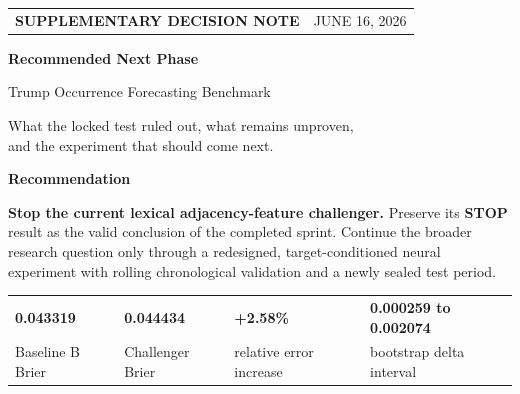\documentclass[10pt,a4paper]{article}
\newcommand{\metric}[1]{\textbf{\color{Ink}#1}}
\begin{document}
\thispagestyle{empty}

\vspace*{2mm}
\begin{tabularx}{\textwidth}{@{}Y r@{}}
  {\color{white!76}\small\bfseries SUPPLEMENTARY DECISION NOTE} &
  {\color{white!76}\small JUNE 16, 2026}\\
\end{tabularx}

\vspace{8mm}
{\color{white}\fontsize{27}{31}\selectfont\bfseries
Recommended Next Phase\par}
\vspace{2mm}
{\color{white}\fontsize{18}{22}\selectfont
Trump Occurrence Forecasting Benchmark\par}
\vspace{5mm}
{\color{white!82}\large
What the locked test ruled out, what remains unproven,\\
and the experiment that should come next.\par}

\vspace{15mm}

\begin{keybox}
  {\large\bfseries Recommendation}\par
  \vspace{1mm}
  \textbf{Stop the current lexical adjacency-feature challenger.}
  Preserve its \metric{STOP} result as the valid conclusion of the completed sprint.
  Continue the broader research question only through a redesigned,
  target-conditioned neural experiment with rolling chronological validation and
  a newly sealed test period.
\end{keybox}

\vspace{5mm}
\begin{tabularx}{\textwidth}{@{}Z|Z|Z|Z@{}}
  {\fontsize{18}{20}\selectfont\bfseries 0.043319} &
  {\fontsize{18}{20}\selectfont\bfseries 0.044434} &
  {\fontsize{18}{20}\selectfont\bfseries +2.58\%} &
  {\fontsize{13}{15}\selectfont\bfseries 0.000259 to 0.002074}\\[-0.5mm]
  {\small\color{Muted}Baseline B Brier} &
  {\small\color{Muted}Challenger Brier} &
  {\small\color{Muted}relative error increase} &
  {\small\color{Muted}bootstrap delta interval}\\
\end{tabularx}
\end{document}
